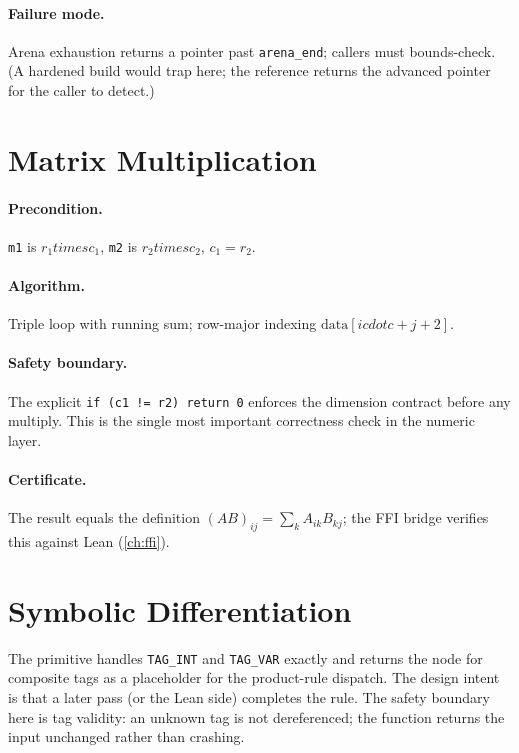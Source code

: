 \paragraph{Failure mode.} Arena exhaustion returns a pointer past
\texttt{arena\_end}; callers must bounds-check. (A hardened build would trap
here; the reference returns the advanced pointer for the caller to detect.)

\section{Matrix Multiplication}
\label{sec:kern-mat}

\paragraph{Precondition.} \texttt{m1} is $r_1\ensuremath{times} c_1$, \texttt{m2} is
$r_2\ensuremath{times} c_2$, $c_1 = r_2$.
\paragraph{Algorithm.} Triple loop with running sum; row-major indexing
$\text{data}[i\ensuremath{cdot} c + j + 2]$.
\paragraph{Safety boundary.} The explicit \texttt{if (c1 != r2) return 0}
enforces the dimension contract before any multiply. This is the single most
important correctness check in the numeric layer.
\paragraph{Certificate.} The result equals the definition
$(AB)_{ij} = \sum_k A_{ik}B_{kj}$; the FFI bridge verifies this against
Lean (\cref{ch:ffi}).

\section{Symbolic Differentiation}
\label{sec:kern-diff}

The primitive handles \texttt{TAG\_INT} and \texttt{TAG\_VAR} exactly and
returns the node for composite tags as a placeholder for the product-rule
dispatch. The design intent is that a later pass (or the Lean side) completes
the rule. The safety boundary here is tag validity: an unknown tag is not
dereferenced; the function returns the input unchanged rather than crashing.

